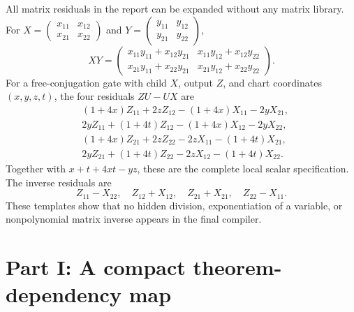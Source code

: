 \documentclass[11pt,letterpaper]{article}
\theoremstyle{definition}
\theoremstyle{remark}
\newcommand{\smallmat}[4]{\begin{pmatrix}#1&#2\\#3&#4\end{pmatrix}}
\begin{document}
All matrix residuals in the report can be expanded without any matrix library. For
$X=\smallmat{x_{11}}{x_{12}}{x_{21}}{x_{22}}$ and
$Y=\smallmat{y_{11}}{y_{12}}{y_{21}}{y_{22}}$,
\begin{equation}\label{gts:vk:eq:scalar-product}
 XY=\begin{pmatrix}
 x_{11}y_{11}+x_{12}y_{21}&x_{11}y_{12}+x_{12}y_{22}\\
 x_{21}y_{11}+x_{22}y_{21}&x_{21}y_{12}+x_{22}y_{22}
 \end{pmatrix}.
\end{equation}
For a free-conjugation gate with child $X$, output $Z$, and chart coordinates $(x,y,z,t)$, the four residuals $ZU-UX$ are
\begin{align*}
 &(1+4x)Z_{11}+2zZ_{12}-(1+4x)X_{11}-2yX_{21},\\
 &2yZ_{11}+(1+4t)Z_{12}-(1+4x)X_{12}-2yX_{22},\\
 &(1+4x)Z_{21}+2zZ_{22}-2zX_{11}-(1+4t)X_{21},\\
 &2yZ_{21}+(1+4t)Z_{22}-2zX_{12}-(1+4t)X_{22}.
\end{align*}
Together with $x+t+4xt-yz$, these are the complete local scalar specification. The inverse residuals are
\[
 Z_{11}-X_{22},\quad Z_{12}+X_{12},\quad
 Z_{21}+X_{21},\quad Z_{22}-X_{11}.
\]
These templates show that no hidden division, exponentiation of a variable, or nonpolynomial matrix inverse appears in the final compiler.

\section{Part I: A compact theorem-dependency map}\label{gts:vk:app:dependencies}
\end{document}
